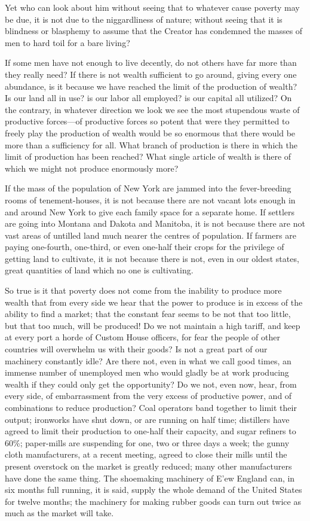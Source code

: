 \documentclass{book}
\begin{document}
Yet who can look about him without seeing that to whatever cause poverty may be due, it is not due to the niggardliness of nature; without seeing that it is blindness or blasphemy to assume that the Creator has condemned the masses of men to hard toil for a bare living?

If some men have not enough to live decently, do not others have far more than they really need? If there is not wealth sufficient to go around, giving every one abundance, is it because we have reached the limit of the production of wealth? Is our land all in use? is our labor all employed? is our capital all utilized? On the contrary, in whatever direction we look we see the most stupendous waste of productive forces—of productive forces so potent that were they permitted to freely play the production of wealth would be so enormous that there would be more than a sufficiency for all. What branch of production is there in which the limit of production has been reached? What single article of wealth is there of which we might not produce enormously more?

If the mass of the population of New York are jammed into the fever-breeding rooms of tenement-houses, it is not because there are not vacant lots enough in and around New York to give each family space for a separate home. If settlers are going into Montana and Dakota and Manitoba, it is not because there are not vast areas of untilled land much nearer the centres of population. If farmers are paying one-fourth, one-third, or even one-half their crops for the privilege of getting land to cultivate, it is not because there is not, even in our oldest states, great quantities of land which no one is cultivating.

So true is it that poverty does not come from the inability to produce more wealth that from every side we hear that the power to produce is in excess of the ability to find a market; that the constant fear seems to be not that too little, but that too much, will be produced! Do we not maintain a high tariff, and keep at every port a horde of Custom House officers, for fear the people of other countries will overwhelm us with their goods? Is not a great part of our machinery constantly idle? Are there not, even in what we call good times, an immense number of unemployed men who would gladly be at work producing wealth if they could only get the opportunity? Do we not, even now, hear, from every side, of embarrassment from the very excess of productive power, and of combinations to reduce production? Coal operators band together to limit their output; ironworks have shut down, or are running on half time; distillers have agreed to limit their production to one-half their capacity, and sugar refiners to 60\%; paper-mills are suspending for one, two or three days a week; the gunny cloth manufacturers, at a recent meeting, agreed to close their mills until the present overstock on the market is greatly reduced; many other manufacturers have done the same thing. The shoemaking machinery of E’ew England can, in six months full running, it is said, supply the whole demand of the United States for twelve months; the machinery for making rubber goods can turn out twice as much as the market will take.
\end{document}
